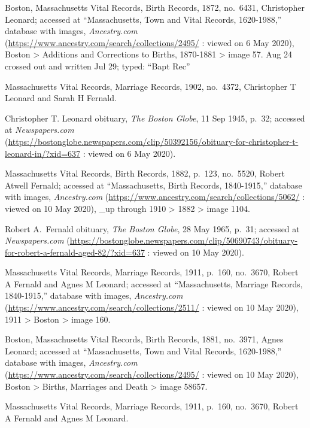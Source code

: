 \begin{thebibliography}{999}
Boston, Massachusetts Vital Records, Birth Records, 1872, no.\ 6431, Christopher Leonard; accessed at ``Massachusetts, Town and Vital Records, 1620-1988,'' database with images, \textit{Ancestry.com} (\url{https://www.ancestry.com/search/collections/2495/} : viewed on 6 May 2020), Boston > Additions and Corrections to Births, 1870-1881 > image 57. Aug 24 crossed out and written Jul 29; typed: ``Bapt Rec''

Massachusetts Vital Records, Marriage Records, 1902, no.\ 4372, Christopher T Leonard and Sarah H Fernald.

Christopher T. Leonard obituary, \textit{The Boston Globe}, 11 Sep 1945, p.\ 32; accessed at \textit{Newspapers.com} (\url{https://bostonglobe.newspapers.com/clip/50392156/obituary-for-christopher-t-leonard-in/?xid=637} : viewed on 6 May 2020).


Massachusetts Vital Records, Birth Records, 1882, p.\ 123, no.\ 5520, Robert Atwell Fernald; accessed at ``Massachusetts, Birth Records, 1840-1915,'' database with images, \textit{Ancestry.com} (\url{https://www.ancestry.com/search/collections/5062/} : viewed on 10 May 2020), \_up through 1910 > 1882 > image 1104.

Robert A.\ Fernald obituary, \textit{The Boston Globe}, 28 May 1965, p.\ 31; accessed at \textit{Newspapers.com} (\url{https://bostonglobe.newspapers.com/clip/50690743/obituary-for-robert-a-fernald-aged-82/?xid=637} : viewed on 10 May 2020).

Massachusetts Vital Records, Marriage Records, 1911, p.\ 160, no.\ 3670, Robert A Fernald and Agnes M Leonard; accessed at ``Massachusetts, Marriage Records, 1840-1915,'' database with images, \textit{Ancestry.com} (\url{https://www.ancestry.com/search/collections/2511/} : viewed on 10 May 2020), 1911 > Boston > image 160.

Boston, Massachusetts Vital Records, Birth Records, 1881, no.\ 3971, Agnes Leonard; accessed at ``Massachusetts, Town and Vital Records, 1620-1988,'' database with images, \textit{Ancestry.com} (\url{https://www.ancestry.com/search/collections/2495/} : viewed on 10 May 2020), Boston > Births, Marriages and Death > image 58657.

Massachusetts Vital Records, Marriage Records, 1911, p.\ 160, no.\ 3670, Robert A Fernald and Agnes M Leonard.


\end{thebibliography}
